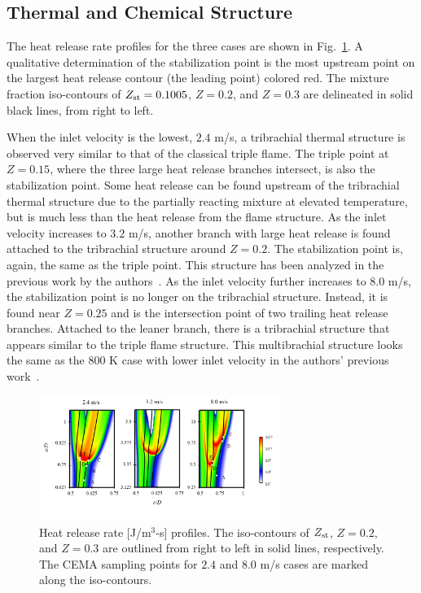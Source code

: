 \documentclass{wssci}
\begin{document}
\subsection{Thermal and Chemical Structure}  
The heat release rate profiles for the three cases are shown in Fig.~\ref{fig:HRR_V}.  A qualitative determination of the stabilization point is the most upstream point on the largest heat release contour (the leading point) colored red.  The mixture fraction iso-contours of $Z_{\rm st} = 0.1005$, $Z = 0.2$, and $Z = 0.3$ are delineated in solid black lines, from right to left.

When the inlet velocity is the lowest, $2.4$ m/s, a tribrachial thermal structure is observed very similar to that of the classical triple flame.  The triple point at $Z = 0.15$, where the three large heat release branches intersect, is also the stabilization point.  Some heat release can be found upstream of the tribrachial thermal structure due to the partially reacting mixture at elevated temperature, but is much less than the heat release from the flame structure.  As the inlet velocity increases to $3.2$ m/s, another branch with large heat release is found attached to the tribrachial structure around $Z = 0.2$.  The stabilization point is, again, the same as the triple point.  This structure has been analyzed in the previous work by the authors~\cite{deng15}.  As the inlet velocity further increases to $8.0$ m/s, the stabilization point is no longer on the tribrachial structure.  Instead, it is found near $Z = 0.25$ and is the intersection point of two trailing heat release branches.  Attached to the leaner branch, there is a tribrachial structure that appears similar to the triple flame structure.  This multibrachial structure looks the same as the $800$ K case with lower inlet velocity in the authors' previous work~\cite{deng15}.

\begin{figure}[t]
  \centering
  \scriptsize
  \vspace{-0.1in}
  \includegraphics[width=0.7\textwidth]{HRR_V.png}
  \normalsize
  \vspace{-0.4in}
  \caption{Heat release rate [J/m$^3$-s] profiles.  The iso-contours of $Z_{\rm st}$, $Z = 0.2$, and $Z = 0.3$ are outlined from right to left in solid lines, respectively.  The CEMA sampling points for $2.4$ and $8.0$ m/s cases are marked along the iso-contours.}
  \label{fig:HRR_V}
\end{figure}
\end{document}
